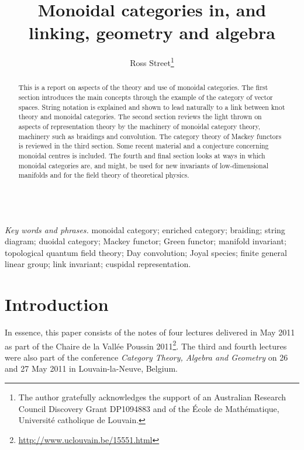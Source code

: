 \documentclass[a4paper,12pt]{article}
\theoremstyle{definition}
\theoremstyle{fact}
\theoremstyle{genquest}
\theoremstyle{step}
\begin{document}
\author{Ross Street\footnote{The author gratefully acknowledges the support of an Australian Research Council Discovery Grant DP1094883 and of the \'Ecole de Math\'ematique, Universit\'e catholique de Louvain.}}
\title{Monoidal categories in, and linking, geometry and algebra}
\date{}
\maketitle

\\
{\small{\emph{Key words and phrases.} monoidal category; enriched category; braiding; string diagram; duoidal category; Mackey functor; Green functor; manifold invariant; topological quantum field theory; Day convolution; Joyal species; finite general linear group; link invariant; cuspidal representation.}}

\begin{abstract}
\noindent This is a report on aspects of the theory and use of monoidal categories.
The first section introduces the main concepts through the example of the category of vector spaces.
String notation is explained and shown to lead naturally to a link between knot theory and monoidal categories.
The second section reviews the light thrown on aspects of representation theory by the machinery of monoidal category theory, machinery such as braidings and convolution.
The category theory of Mackey functors is reviewed in the third section. Some recent material and a conjecture concerning monoidal centres is included. 
The fourth and final section looks at ways in which monoidal categories are, and might, be used for new invariants of low-dimensional manifolds and for the field theory of theoretical physics.

\end{abstract}



\section*{Introduction}

In essence, this paper consists of the notes of four lectures delivered in May 2011 as part of the Chaire de la Vall\'ee Poussin 2011\footnote{\url{http://www.uclouvain.be/15551.html}}. 
The third and fourth lectures were also part of the conference \emph{Category Theory, Algebra and Geometry} on 26 and 27 May 2011 in Louvain-la-Neuve, Belgium.    
\end{document}

